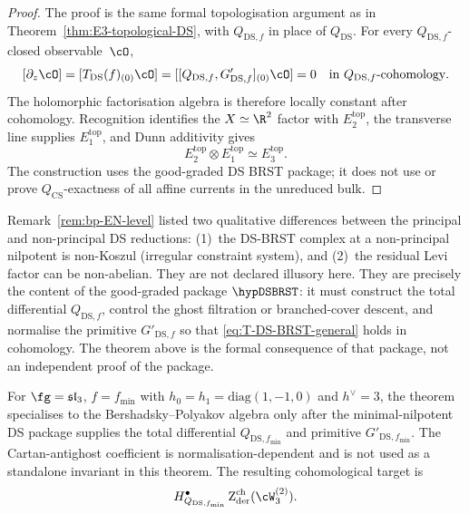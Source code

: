\begin{proof}
The proof is the same formal topologisation argument as in
Theorem~\ref{thm:E3-topological-DS}, with \(Q_{\mathrm{DS},f}\) in
place of \(Q_{\mathrm{DS}}\).  For every
\(Q_{\mathrm{DS},f}\)-closed observable~\(\cO\),
\[
[\partial_z\cO]
= [T_{\mathrm{DS}}(f)_{(0)}\cO]
= [[Q_{\mathrm{DS},f},G'_{\mathrm{DS},f}]_{(0)}\cO]
=0
\quad\text{in }Q_{\mathrm{DS},f}\text{-cohomology}.
\]
The holomorphic factorisation algebra is therefore locally constant
after cohomology.  Recognition identifies the \(X\simeq\R^2\) factor
with \(E_2^{\mathrm{top}}\), the transverse line supplies
\(E_1^{\mathrm{top}}\), and Dunn additivity gives
\[
E_2^{\mathrm{top}}\otimes E_1^{\mathrm{top}}
\simeq E_3^{\mathrm{top}}.
\]
The construction uses the good-graded DS BRST package; it does not use
or prove \(Q_{\mathrm{CS}}\)-exactness of all affine currents in the
unreduced bulk.
\end{proof}

\begin{remark}
\label{rem:non-principal-obstructions-illusory}
Remark~\textup{\ref{rem:bp-EN-level}} listed two qualitative
differences between the principal and non-principal DS reductions:
\textup{(1)}~the DS-BRST complex at a non-principal nilpotent
is non-Koszul \textup{(}irregular constraint system\textup{)},
and \textup{(2)}~the residual Levi factor can be non-abelian.
They are not declared illusory here.  They are precisely the content
of the good-graded package \(\hypDSBRST\): it must construct the
total differential \(Q_{\mathrm{DS},f}\), control the ghost filtration
or branched-cover descent, and normalise the primitive
\(G'_{\mathrm{DS},f}\) so that \eqref{eq:T-DS-BRST-general} holds in
cohomology.  The theorem above is the formal consequence of that
package, not an independent proof of the package.
\end{remark}

\begin{remark}
\label{rem:E3-DS-BP-specialisation}
For $\fg = \mathfrak{sl}_3$, $f = f_{\min}$ with
$h_0 = h_1 = \mathrm{diag}(1, -1, 0)$ and \(h^\vee=3\), the theorem
specialises to the Bershadsky--Polyakov algebra only after the
minimal-nilpotent DS package supplies the total differential
\(Q_{\mathrm{DS},f_{\min}}\) and primitive
\(G'_{\mathrm{DS},f_{\min}}\).  The Cartan-antighost coefficient is
normalisation-dependent and is not used as a standalone invariant in
this theorem.  The resulting cohomological target is
\[
H_{Q_{\mathrm{DS},f_{\min}}}^\bullet
\Zder^{\mathrm{ch}}(\cW_3^{(2)}).
\]
\end{remark}

